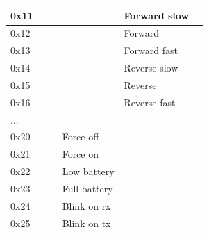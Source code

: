 \documentclass[a4paper]{article}
\begin{document}
\begin{table}[h]
\begin{tabular}{|l|l|l|l|l|l|}
               0x11           &                       &                       &                    &  Forward slow         &                       \\ \hline   
               0x12           &                       &                       &                    &  Forward              &                       \\ \hline   
               0x13           &                       &                       &                    &  Forward fast         &                       \\ \hline   
               0x14           &                       &                       &                    &  Reverse slow         &                       \\ \hline   
               0x15           &                       &                       &                    &  Reverse              &                       \\ \hline   
               0x16           &                       &                       &                    &  Reverse fast         &                       \\ \hline   
               ...            &                       &                       &                    &                       &                       \\ \hline   
               0x20           &                       &                       &  Force off         &                       &                       \\ \hline   
               0x21           &                       &                       &  Force on          &                       &                       \\ \hline   
               0x22           &                       &                       &  Low battery       &                       &                       \\ \hline   
               0x23           &                       &                       &  Full battery      &                       &                       \\ \hline   
               0x24           &                       &                       &  Blink on rx       &                       &                       \\ \hline   
               0x25           &                       &                       &  Blink on tx       &                       &                       \\ \hline   

\end{tabular}
\end{table}
\end{document}
